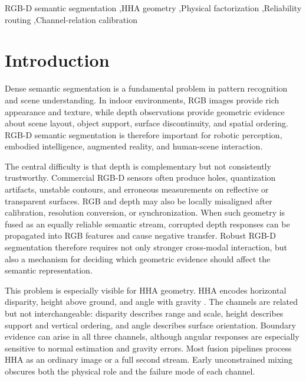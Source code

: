 \documentclass[a4paper,fleqn]{cas-dc}
\begin{document}

\begin{keywords}
RGB-D semantic segmentation \sep HHA geometry \sep Physical factorization \sep Reliability routing \sep Channel-relation calibration
\end{keywords}

\maketitle

\section{Introduction}\label{sec:introduction}

Dense semantic segmentation is a fundamental problem in pattern recognition and scene understanding. In indoor environments, RGB images provide rich appearance and texture, while depth observations provide geometric evidence about scene layout, object support, surface discontinuity, and spatial ordering. RGB-D semantic segmentation is therefore important for robotic perception, embodied intelligence, augmented reality, and human-scene interaction.

The central difficulty is that depth is complementary but not consistently trustworthy. Commercial RGB-D sensors often produce holes, quantization artifacts, unstable contours, and erroneous measurements on reflective or transparent surfaces. RGB and depth may also be locally misaligned after calibration, resolution conversion, or synchronization. When such geometry is fused as an equally reliable semantic stream, corrupted depth responses can be propagated into RGB features and cause negative transfer. Robust RGB-D segmentation therefore requires not only stronger cross-modal interaction, but also a mechanism for deciding which geometric evidence should affect the semantic representation.

This problem is especially visible for HHA geometry. HHA encodes horizontal disparity, height above ground, and angle with gravity \citep{gupta2014hha}. The channels are related but not interchangeable: disparity describes range and scale, height describes support and vertical ordering, and angle describes surface orientation. Boundary evidence can arise in all three channels, although angular responses are especially sensitive to normal estimation and gravity errors. Most fusion pipelines process HHA as an ordinary image or a full second stream. Early unconstrained mixing obscures both the physical role and the failure mode of each channel.
\end{document}
